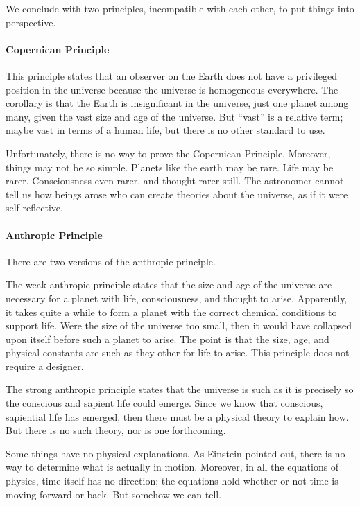 We conclude with two principles, incompatible with each other, to put things into perspective.

\paragraph{Copernican Principle}


This principle states that an observer on the Earth does not have a privileged position in the universe because the universe is homogeneous everywhere. The corollary is that the Earth is insignificant in the universe, just one planet among many, given the vast size and age of the universe. But ``vast'' is a relative term; maybe vast in terms of a human life, but there is no other standard to use.

Unfortunately, there is no way to prove the Copernican Principle. Moreover, things may not be so simple. Planets like the earth may be rare. Life may be rarer. Consciousness even rarer, and thought rarer still. The astronomer cannot tell us how beings arose who can create theories about the universe, as if it were self-reflective.

\paragraph{Anthropic Principle}


There are two versions of the anthropic principle.

The weak anthropic principle states that the size and age of the universe are necessary for a planet with life, consciousness, and thought to arise. Apparently, it takes quite a while to form a planet with the correct chemical conditions to support life. Were the size of the universe too small, then it would have collapsed upon itself before such a planet to arise. The point is that the size, age, and physical constants are such as they other for life to arise. This principle does not require a designer.

The strong anthropic principle states that the universe is such as it is precisely so the conscious and sapient life could emerge. Since we know that conscious, sapiential life has emerged, then there must be a physical theory to explain how. But there is no such theory, nor is one forthcoming.

Some things have no physical explanations. As Einstein pointed out, there is no way to determine what is actually in motion. Moreover, in all the equations of physics, time itself has no direction; the equations hold whether or not time is moving forward or back. But somehow we can tell.


